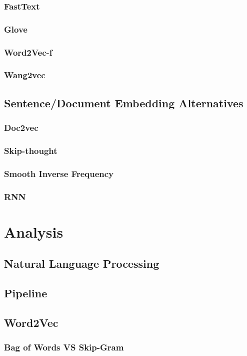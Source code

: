 \subsection{FastText}
\subsection{Glove}
\subsection{Word2Vec-f}
\subsection{Wang2vec}


\section{Sentence/Document Embedding Alternatives}
\subsection{Doc2vec}
\subsection{Skip-thought}
\subsection{Smooth Inverse Frequency}
\subsection{RNN}



\chapter{Analysis}
\label{chap:analysis}
\section{Natural Language Processing}
\section{Pipeline}
\section{Word2Vec}
\subsection{Bag of Words VS Skip-Gram}
